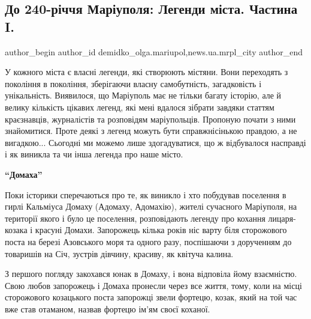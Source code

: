  
 
 
 
 
 
\subsection{До 240-річчя Маріуполя: Легенди міста. Частина I.}
\label{sec:12_09_2018.stz.news.ua.mrpl_city.1.240_rokiv_legendy_mrpl_1}
 
\ifcmt
 author_begin
   author_id demidko_olga.mariupol,news.ua.mrpl_city
 author_end
\fi

\vspace{0.5cm}

У кожного міста є власні легенди, які створюють містяни. Вони переходять з
покоління в покоління, зберігаючи власну самобутність, загадковість і
унікальність. Виявилося, що Маріуполь має не тільки багату історію, але й
велику кількість цікавих легенд, які мені вдалося зібрати завдяки статтям
краєзнавців, журналістів та розповідям маріупольців. Пропоную почати з ними
знайомитися. Проте деякі з легенд можуть бути справжнісінькою правдою, а не
вигадкою... Сьогодні ми можемо лише здогадуватися, що ж відбувалося насправді і
як виникла та чи інша легенда про наше місто.

\begin{center}
\textbf{\enquote{Домаха}}
\end{center}

Поки історики сперечаються про те, як виникло і хто побудував поселення в гирлі
Кальміуса Домаху (Адомаху, Адомахію), жителі сучасного Маріуполя, на території
якого і було це поселення, розповідають легенду про кохання лицаря-козака і
красуні Домахи. Запорожець кілька років ніс варту біля сторожового поста на
березі Азовського моря та одного разу, поспішаючи з дорученням до товаришів на
Січ, зустрів дівчину, красиву, як квітуча калина.

З першого погляду закохався юнак в Домаху, і вона відповіла йому взаємністю.
Свою любов запорожець і Домаха пронесли через все життя, тому, коли на місці
сторожового козацького поста запорожці звели фортецю, козак, який на той час
вже став отаманом, назвав фортецю ім'ям своєї коханої.


